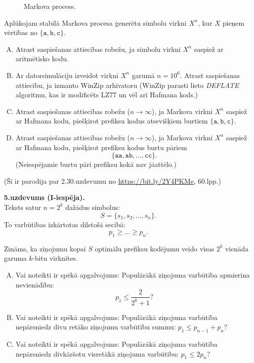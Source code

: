 \documentclass[a4paper]{article}
\begin{document}
\begin{figure}[!htb]
\caption{\label{fig:markov-chain} Markova process.}
\end{figure}

Aplūkojam stabilā Markova procesa ģenerētu simbolu virkni $X^n$, kur 
$X$ pieņem vērtības no $\{\mathtt{a}, \mathtt{b}, \mathtt{c}\}$.
\begin{enumerate}[(A)]
\item Atrast saspiešanas attiecības robežu, ja simbolu virkni $X^n$ saspiež ar 
aritmētisko kodu.
\item Ar datorsimulāciju izveidot virkni $X^n$ garumā $n = 10^6$. 
Atrast saspiešanas attiecību, ja izmanto WinZip arhivatoru 
(WinZip parasti lie\-to {\em DEFLATE} algoritmu, kas ir modificēts LZ77 un 
vēl arī Hafmana kods.)
\item Atrast saspiešanas attiecības robežu ($n \rightarrow \infty$),
ja Markova virkni $X^n$ saspiež ar Hafmana kodu, 
piešķirot prefiksu kodus atsevišķiem burtiem $\{\mathtt{a}, \mathtt{b}, \mathtt{c}\}$.
\item Atrast saspiešanas attiecības robežu ($n \rightarrow \infty$),
ja Markova virkni $X^n$ saspiež ar Hafmana kodu, piešķirot prefiksu kodus 
burtu pāriem 
$$\{\mathtt{aa}, \mathtt{ab}, \ldots, \mathtt{cc}\}.$$
(Neiespējamie burtu pāri prefiksu kokā nav jāattēlo.)
\end{enumerate}

(Šī ir parodija par 2.30.uzdevumu no \url{https://bit.ly/2Y4PKMe}, 60.lpp.)



\vspace{10pt}
{\bf 5.uzdevums (I-iespēja).}\\
Teksts satur $n = 2^k$ dažādus simbolus: 
$$S = \{ s_1,s_2,\ldots,s_n \}.$$ 
To
varbūtības izkārtotas dilstošā secībā: 
$$p_1 \geq \ldots \geq p_n.$$ 

Zināms, ka ziņojumu kopai $S$
optimālu prefiksu ko\-dē\-ju\-mu veido visas 
$2^k$ vienāda garuma $k$-bitu virk\-nī\-tes. 

\begin{enumerate}[(A)]
\item Vai noteikti ir spēkā apgalvojums: Populārākā ziņojuma varbūtība 
apmierina nevienādību: 
$${\displaystyle p_1 \leq \frac{2}{2^k + 1}}?$$
\item Vai noteikti ir spēkā apgalvojums: Populārākā ziņojuma varbūtība 
nepārsniedz divu retāko ziņojumu varbūtību summu: $p_1 \leq p_{n-1} + p_{n}$?
\item Vai noteikti ir spēkā apgalvojums: Populārākā ziņojuma varbūtība 
nepārsniedz divkāršotu visretākā ziņojuma varbūtību: $p_1 \leq 2p_n$?
\end{enumerate}
\end{document}
